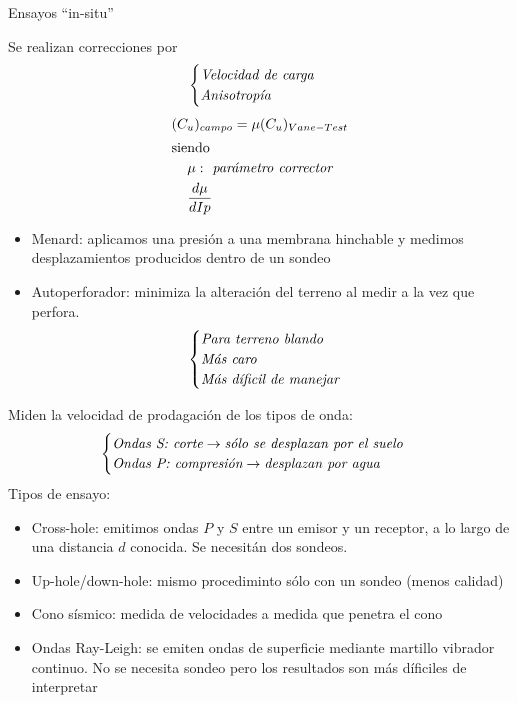 \begin{mybox}{Ensayos ``in-situ''}
	\begin{myrem}[Correcciones]
		Se realizan correcciones por 
		\begin{equation}
			\begin{cases}
				\emph{Velocidad de carga}\\
				\emph{Anisotropía}
			\end{cases}
		\end{equation}
		\begin{gather}\label{eq:2.1}
	     (C_u)_{campo} = \mu (C_u)_{Vane-Test} \\
	      \shortintertext{siendo}
	      \begin{aligned}
	        &\mu  :\emph{ parámetro corrector}\\
	        & \frac{d \mu}{dIp}
	      \end{aligned}\notag
	    \end{gather}
	\end{myrem}


	\begin{itemize}
		\item Menard: aplicamos una presión a una membrana hinchable y medimos desplazamientos producidos dentro de un sondeo
		\item Autoperforador: minimiza la alteración del terreno al medir a la vez que perfora.
		\begin{equation}
			\begin{cases}
				\emph{Para terreno blando}\\
				\emph{Más caro}\\
				\emph{Más díficil de manejar}
			\end{cases}
		\end{equation}
	\end{itemize}


	Miden la velocidad de prodagación de los tipos de onda:
	\begin{equation}
			\begin{cases}
				\emph{Ondas S: corte} \rightarrow \emph{sólo se desplazan por el suelo}\\
				\emph{Ondas P: compresión} \rightarrow \emph{desplazan por agua}
			\end{cases}
	\end{equation}
	Tipos de ensayo:
	\begin{itemize}
		\item Cross-hole: emitimos ondas $P$ y $S$ entre un emisor y un receptor, a lo largo de una distancia $d$ conocida. Se necesitán dos sondeos.
		\item Up-hole/down-hole: mismo procediminto sólo con un sondeo (menos calidad)
		\item Cono sísmico: medida de velocidades a medida que penetra el cono
		\item Ondas Ray-Leigh: se emiten ondas de superficie mediante martillo vibrador continuo. No se necesita sondeo pero los resultados son más díficiles de interpretar
	\end{itemize}


\end{mybox}
